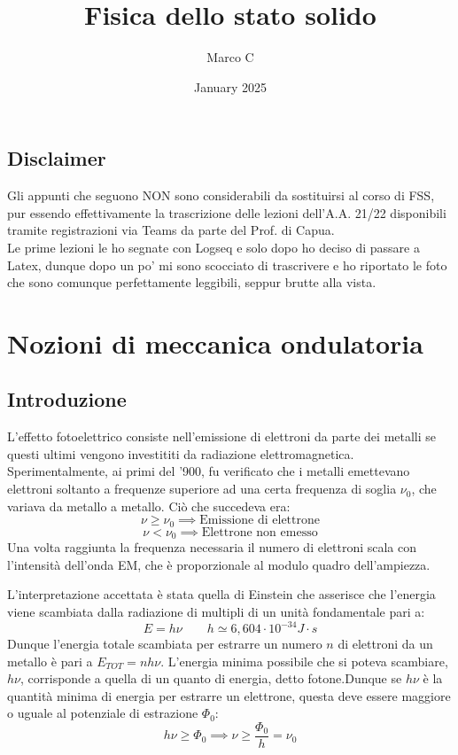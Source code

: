 \documentclass{book}
\title{Fisica dello stato solido}
\author{Marco C}
\date{January 2025}
\begin{document}
\maketitle

\section*{Disclaimer}
    Gli appunti che seguono NON sono considerabili da sostituirsi al corso di FSS, pur essendo effettivamente la trascrizione delle lezioni dell'A.A. 21/22 disponibili tramite registrazioni via Teams da parte del Prof. di Capua.\\
    Le prime lezioni le ho segnate con Logseq e solo dopo ho deciso di passare a Latex, dunque dopo un po' mi sono scocciato di trascrivere e ho riportato le foto che sono comunque perfettamente leggibili, seppur brutte alla vista.
\chapter{Nozioni di meccanica ondulatoria}
    \section{Introduzione}
        L'effetto fotoelettrico consiste nell'emissione di elettroni da parte dei metalli se questi ultimi vengono investititi da radiazione elettromagnetica. Sperimentalmente, ai primi del '900, fu verificato che i metalli emettevano elettroni soltanto a frequenze superiore ad una certa frequenza di soglia $\nu_{0}$, che variava da metallo a metallo. Ciò che succedeva era:
        $$\nu \geq \nu_{0} \implies \textrm{Emissione di elettrone}$$
        $$\nu < \nu_{0} \implies \textrm{Elettrone non emesso}$$
        Una volta raggiunta la frequenza necessaria il numero di elettroni scala con l'intensità dell'onda EM, che è proporzionale al modulo quadro dell'ampiezza.

        L'interpretazione accettata è stata quella di Einstein che asserisce che l'energia viene scambiata dalla radiazione di multipli di un unità fondamentale pari a:
        $$E = h \nu \qquad h \simeq 6,604 \cdot 10^{-34} J \cdot s$$
        Dunque l'energia totale scambiata per estrarre un numero $n$ di elettroni da un metallo è pari a $E_{TOT} = n h \nu$.  L'energia minima possibile che si poteva scambiare, $h \nu$, corrisponde a quella di un quanto di energia, detto fotone.Dunque se $h \nu$ è la quantità minima di energia per estrarre un elettrone, questa deve essere maggiore o uguale al potenziale di estrazione $\Phi_{0}$:
        $$h \nu \geq \Phi_{0} \implies \nu \geq \frac{\Phi_{0}}{h} = \nu_{0}$$
\end{document}
